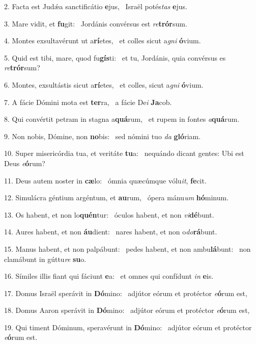 2. Facta est Judǽa sanctificátio \textbf{e}jus, \ast\  Israël potés\textit{tas} \textbf{e}jus.\

3. Mare vidit, et \textbf{fu}git: \ast\  Jordánis convérsus est \textit{re}\textbf{trór}sum.\

4. Montes exsultavérunt ut a\textbf{rí}etes, \ast\  et colles sicut a\textit{gni} \textbf{ó}vium.\

5. Quid est tibi, mare, quod fu\textbf{gís}ti: \ast\  et tu, Jordánis, quia convérsus es \textit{re}\textbf{trór}sum?\

6. Montes, exsultástis sicut a\textbf{rí}etes, \ast\  et colles, sicut a\textit{gni} \textbf{ó}vium.\

7. A fácie Dómini mota est \textbf{ter}ra, \ast\  a fácie De\textit{i} \textbf{Ja}cob.\

8. Qui convértit petram in stagna a\textbf{quá}rum, \ast\  et rupem in fontes \textit{a}\textbf{quá}rum.\

9. Non nobis, Dómine, non \textbf{no}bis: \ast\  sed nómini tuo \textit{da} \textbf{gló}riam.\

10. Super misericórdia tua, et veritáte \textbf{tu}a: \ast\  nequándo dicant gentes: Ubi est Deus \textit{e}\textbf{ó}rum?\

11. Deus autem noster in \textbf{cæ}lo: \ast\  ómnia quæcúmque vólu\textit{it}, \textbf{fe}cit.\

12. Simulácra géntium argéntum, et \textbf{au}rum, \ast\  ópera mánu\textit{um} \textbf{hó}minum.\

13. Os habent, et non lo\textbf{quén}tur: \ast\  óculos habent, et non \textit{vi}\textbf{dé}bunt.\

14. Aures habent, et non \textbf{áu}dient: \ast\  nares habent, et non o\textit{do}\textbf{rá}bunt.\

15. Manus habent, et non palpábunt: \dag\  pedes habent, et non ambu\textbf{lá}bunt: \ast\  non clamábunt in gúttu\textit{re} \textbf{su}o.\

16. Símiles illis fiant qui fáciunt \textbf{e}a: \ast\  et omnes qui confídunt \textit{in} \textbf{e}is.\

17. Domus Israël sperávit in \textbf{Dó}mino: \ast\  adjútor eórum et protéctor \textit{e}\textbf{ó}rum est,\

18. Domus Aaron sperávit in \textbf{Dó}mino: \ast\  adjútor eórum et protéctor \textit{e}\textbf{ó}rum est,\

19. Qui timent Dóminum, speravérunt in \textbf{Dó}mino: \ast\  adjútor eórum et protéctor \textit{e}\textbf{ó}rum est.\

